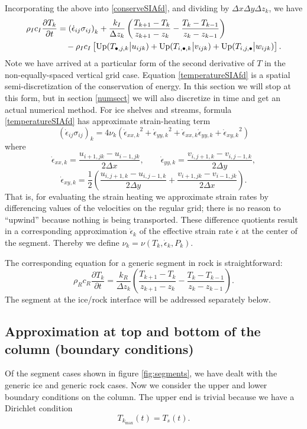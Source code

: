 \documentclass[12pt,final]{amsart}%
\theoremstyle{plain}
\theoremstyle{definition}
\theoremstyle{remark}
\newcommand{\ddt}[1]{\ensuremath{\frac{\partial #1}{\partial t}}}
\def\eps{\epsilon}
\newcommand{\Up}{\ensuremath{\operatorname{Up}}}
\begin{document}
Incorporating the above into \eqref{conserveSIAfd}, and dividing by $\Delta x\Delta y\Delta z_k$, we have
\begin{align}
\rho_I c_I \ddt{T_k} &= \left(\dot\eps_{ij} \sigma_{ij}\right)_k + \frac{k_I}{\Delta z_k} \left(\frac{T_{k+1}-T_k}{z_{k+1}-z_k} - \frac{T_k-T_{k-1}}{z_k-z_{k-1}}\right) \label{temperatureSIAfd}\\
    &\quad - \rho_I c_I \left[\Up(T_{\bullet,j,k} \big|u_{ijk}) + \Up(T_{i,\bullet,k} \big|v_{ijk}) + \Up(T_{i,j,\bullet} \big|w_{ijk})\right]. \notag
\end{align}
Note we have arrived at a particular form of the second derivative of $T$ in the non-equally-spaced vertical grid case.  Equation \eqref{temperatureSIAfd} is a spatial semi-discretization of the conservation of energy.  In this section we will stop at this form, but in section \ref{numsect} we will also discretize in time and get an actual numerical method.  For ice shelves and streams, formula \eqref{temperatureSIAfd} has approximate strain-heating term
\begin{equation}\label{icestreamstrainheatrule}
\left(\dot\eps_{ij} \sigma_{ij}\right)_k = 4 \nu_k \left({\dot\eps_{xx,k}}^2 + {\dot\eps_{yy,k}}^2 + \dot\eps_{xx,k} \dot\eps_{yy,k} + {\dot\eps_{xy,k}}^2\right)
\end{equation}
where
    $$\dot\eps_{xx,k} = \frac{u_{i+1,jk} - u_{i-1,jk}}{2\Delta x}, \qquad\dot\eps_{yy,k} = \frac{v_{i,j+1,k} - v_{i,j-1,k}}{2\Delta y},$$
    $$\dot\eps_{xy,k} = \frac{1}{2}\left(\frac{u_{i,j+1,k} - u_{i,j-1,k}}{2\Delta y} + \frac{v_{i+1,jk} - v_{i-1,jk}}{2\Delta x}\right).$$
That is, for evaluating the strain heating we approximate strain rates by differencing values of the velocities on the regular grid; there is no reason to ``upwind'' because nothing is being transported.  These difference quotients result in a corresponding approximation $\dot\eps_k$ of the effective strain rate $\dot\eps$ at the center of the segment.  Thereby we define $\nu_k = \nu(T_k,\dot\eps_k,P_k)$.

The corresponding equation for a generic segment in rock is straightforward:
\begin{equation}
\rho_R c_R \ddt{T_k} = \frac{k_R}{\Delta z_k} \left(\frac{T_{k+1}-T_k}{z_{k+1}-z_k} - \frac{T_k-T_{k-1}}{z_k-z_{k-1}}\right). \label{temperatureROCKfd}
\end{equation}
The segment at the ice/rock interface will be addressed separately below.

\subsection*{Approximation at top and bottom of the column (boundary conditions)}  Of the segment cases shown in figure \ref{fig:segments}, we have dealt with the generic ice and generic rock cases.  Now we consider the upper and lower boundary conditions on the column.  The upper end is trivial because we have a Dirichlet condition
\begin{equation}\label{topDirichlet}
T_{k_{\max}}(t) = T_s(t).
\end{equation}
\end{document}
